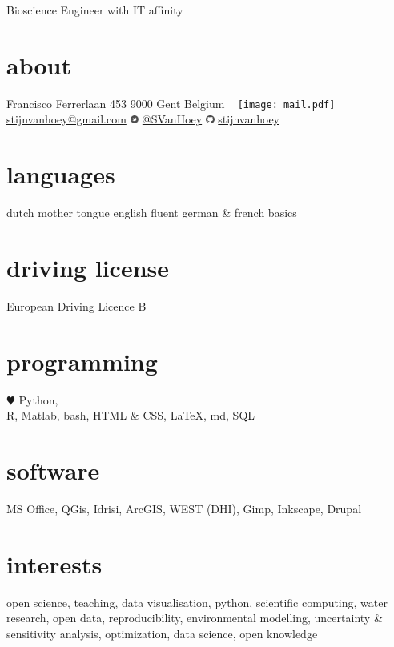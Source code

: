 \documentclass[]{stvhoey-cv}  %
\begin{document}
       {Bioscience Engineer with IT affinity}%

\begin{aside}
  \section{about}
    Francisco Ferrerlaan 453
    9000 Gent
    Belgium
    ~
    \texttt{[image: mail.pdf]}   \href{mailto:stijnvanhoey@gmail.com}{stijnvanhoey@gmail.com} 
    	\includegraphics[height=8pt]{twitter.pdf} \href{https://twitter.com/svanhoey}{@SVanHoey}
	\includegraphics[height=8pt]{github.pdf} \href{http://github.com/stijnvanhoey}{stijnvanhoey}%
  \section{languages}
    dutch mother tongue
    english fluent
   german \&  french basics
  \section{driving license}
  European Driving
  Licence B
  \section{programming}
	{\color{red} $\varheartsuit$} Python,\\%
    R, Matlab, bash,
    HTML \& CSS,
    \LaTeX, md,
    SQL
  \section{software}
   MS Office,
   QGis, Idrisi, ArcGIS,
   WEST (DHI),
   Gimp, Inkscape,
   Drupal
\end{aside}
   
\section{interests}
open science, teaching, data visualisation, python, scientific computing, water research, open data, reproducibility, environmental modelling, uncertainty \& sensitivity analysis, optimization, data science, open knowledge \vspace{\baselineskip}
\end{document}
